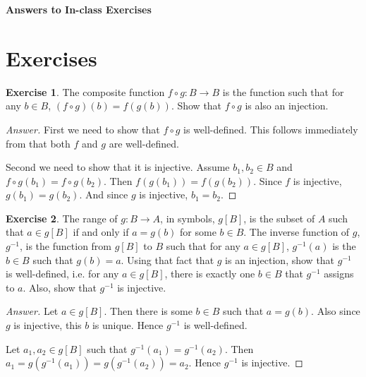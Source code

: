 \documentclass[11pt]{article}
\theoremstyle{definition}
\newtheorem{exer}{Exercise}
\begin{document}




\begin{center}
{\LARGE \bf Answers to In-class Exercises}
\end{center}

\smallskip

\section{Exercises}

\begin{exer}
The composite function $f \circ g: B \rightarrow B$ is the function such that for any $b \in B$, $(f \circ g)(b) = f(g(b))$. Show that $f \circ g$ is also an injection.
\end{exer}

\begin{proof}[Answer]
First we need to show that $f \circ g$ is well-defined. This follows immediately from that both $f$ and $g$ are well-defined.

Second we need to show that it is injective. Assume $b_1, b_2 \in B$ and $f \circ g(b_1) = f \circ g(b_2)$. Then $f(g(b_1)) = f(g(b_2))$. Since $f$ is injective, $g(b_1) = g(b_2)$. And since $g$ is injective, $b_1 = b_2$.
\end{proof}

\begin{exer}
The range of $g: B \rightarrow A$, in symbols, $g[B]$, is the subset of $A$ such that $a \in g[B]$ if and only if $a = g(b)$ for some $b \in B$. The inverse function of $g$, $g^{-1}$, is the function from $g[B]$ to $B$ such that for any $a \in g[B]$, $g^{-1}(a)$ is the $b \in B$ such that $g(b) = a$. Using that fact that $g$ is an injection, show that $g^{-1}$ is well-defined, i.e. for any $a \in g[B]$, there is exactly one $b \in B$ that $g^{-1}$ assigns to $a$. Also, show that $g^{-1}$ is injective.
\end{exer}

\begin{proof}[Answer]
Let $a \in g[B]$. Then there is some $b \in B$ such that $a = g(b)$. Also since $g$ is injective, this $b$ is unique. Hence $g^{-1}$ is well-defined.

Let $a_1, a_2 \in g[B]$ such that $g^{-1}(a_1) = g^{-1}(a_2)$. Then $a_1 = g(g^{-1}(a_1)) = g(g^{-1}(a_2)) = a_2$. Hence $g^{-1}$ is injective.

\end{proof}
\end{document}
